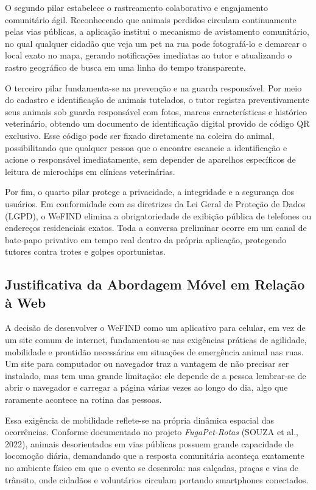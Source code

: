 O segundo pilar estabelece o rastreamento colaborativo e engajamento comunitário ágil. Reconhecendo que animais perdidos circulam continuamente pelas vias públicas, a aplicação institui o mecanismo de avistamento comunitário, no qual qualquer cidadão que veja um pet na rua pode fotografá-lo e demarcar o local exato no mapa, gerando notificações imediatas ao tutor e atualizando o rastro geográfico de busca em uma linha do tempo transparente.

O terceiro pilar fundamenta-se na prevenção e na guarda responsável. Por meio do cadastro e identificação de animais tutelados, o tutor registra preventivamente seus animais sob guarda responsável com fotos, marcas características e histórico veterinário, obtendo um documento de identificação digital provido de código QR exclusivo. Esse código pode ser fixado diretamente na coleira do animal, possibilitando que qualquer pessoa que o encontre escaneie a identificação e acione o responsável imediatamente, sem depender de aparelhos específicos de leitura de microchips em clínicas veterinárias.

Por fim, o quarto pilar protege a privacidade, a integridade e a segurança dos usuários. Em conformidade com as diretrizes da Lei Geral de Proteção de Dados (LGPD), o WeFIND elimina a obrigatoriedade de exibição pública de telefones ou endereços residenciais exatos. Toda a conversa preliminar ocorre em um canal de bate-papo privativo em tempo real dentro da própria aplicação, protegendo tutores contra trotes e golpes oportunistas.

\subsection{Justificativa da Abordagem Móvel em Relação à Web}

A decisão de desenvolver o WeFIND como um aplicativo para celular, em vez de um site comum de internet, fundamentou-se nas exigências práticas de agilidade, mobilidade e prontidão necessárias em situações de emergência animal nas ruas. Um site para computador ou navegador traz a vantagem de não precisar ser instalado, mas tem uma grande limitação: ele depende de a pessoa lembrar-se de abrir o navegador e carregar a página várias vezes ao longo do dia, algo que raramente acontece na rotina das pessoas.

Essa exigência de mobilidade reflete-se na própria dinâmica espacial das ocorrências. Conforme documentado no projeto \textit{FugaPet-Rotas} (SOUZA et al., 2022), animais desorientados em vias públicas possuem grande capacidade de locomoção diária, demandando que a resposta comunitária aconteça exatamente no ambiente físico em que o evento se desenrola: nas calçadas, praças e vias de trânsito, onde cidadãos e voluntários circulam portando smartphones conectados.

